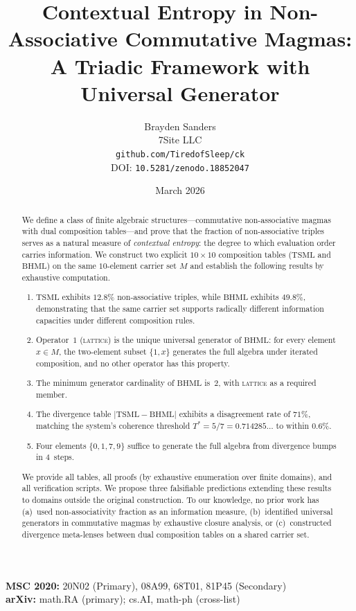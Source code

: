 \documentclass[11pt,a4paper]{article}
\title{Contextual Entropy in Non-Associative Commutative Magmas:\\
A Triadic Framework with Universal Generator}
\author{Brayden Sanders\\
7Site LLC\\
\texttt{github.com/TiredofSleep/ck}\\
DOI: \texttt{10.5281/zenodo.18852047}}
\date{March 2026}
\theoremstyle{definition}
\theoremstyle{remark}
\newcommand{\TSML}{\mathrm{TSML}}
\newcommand{\BHML}{\mathrm{BHML}}
\newcommand{\Tstar}{T^{*}}
\begin{document}
\maketitle

\noindent\textbf{MSC 2020:} 20N02 (Primary), 08A99, 68T01, 81P45 (Secondary)\\
\textbf{arXiv:} math.RA (primary); cs.AI, math-ph (cross-list)

\begin{abstract}
We define a class of finite algebraic structures---commutative non-associative magmas with dual composition tables---and prove that the fraction of non-associative triples serves as a natural measure of \emph{contextual entropy}: the degree to which evaluation order carries information. We construct two explicit $10\times 10$ composition tables ($\TSML$ and $\BHML$) on the same $10$-element carrier set $M$ and establish the following results by exhaustive computation.
\begin{enumerate}[label=(\arabic*)]
\item $\TSML$ exhibits $12.8\%$ non-associative triples, while $\BHML$ exhibits $49.8\%$, demonstrating that the same carrier set supports radically different information capacities under different composition rules.
\item Operator~$1$ (\textsc{lattice}) is the unique universal generator of $\BHML$: for every element $x\in M$, the two-element subset $\{1,x\}$ generates the full algebra under iterated composition, and no other operator has this property.
\item The minimum generator cardinality of $\BHML$ is~$2$, with \textsc{lattice} as a required member.
\item The divergence table $|\TSML - \BHML|$ exhibits a disagreement rate of $71\%$, matching the system's coherence threshold $\Tstar = 5/7 = 0.714285\ldots$ to within $0.6\%$.
\item Four elements $\{0,1,7,9\}$ suffice to generate the full algebra from divergence bumps in $4$~steps.
\end{enumerate}
We provide all tables, all proofs (by exhaustive enumeration over finite domains), and all verification scripts. We propose three falsifiable predictions extending these results to domains outside the original construction. To our knowledge, no prior work has (a)~used non-associativity fraction as an information measure, (b)~identified universal generators in commutative magmas by exhaustive closure analysis, or (c)~constructed divergence meta-lenses between dual composition tables on a shared carrier set.
\end{abstract}
\end{document}
